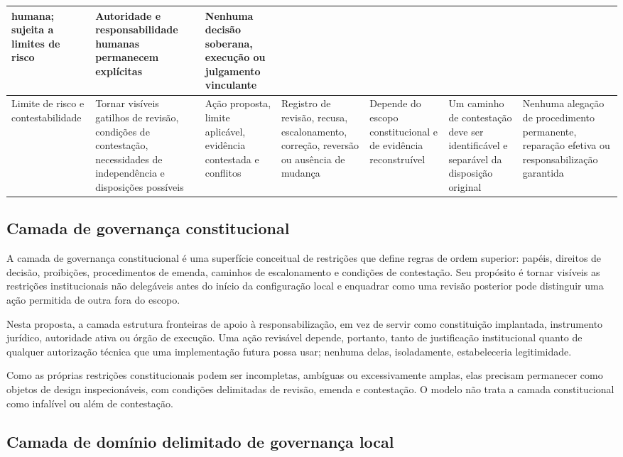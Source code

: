 \documentclass[11pt]{article}
\begin{document}
\begin{landscape}
\begin{center}
\begin{tabularx}{\linewidth}{|X|X|X|X|X|X|X|}
humana; sujeita a limites de risco & Autoridade e responsabilidade humanas
permanecem explícitas & Nenhuma decisão soberana, execução ou julgamento
vinculante \\
\hline
Limite de risco e contestabilidade & Tornar visíveis gatilhos de revisão,
condições de contestação, necessidades de independência e disposições possíveis
& Ação proposta, limite aplicável, evidência contestada e conflitos & Registro
de revisão, recusa, escalonamento, correção, reversão ou ausência de mudança &
Depende do escopo constitucional e de evidência reconstruível & Um caminho de
contestação deve ser identificável e separável da disposição original &
Nenhuma alegação de procedimento permanente, reparação efetiva ou
responsabilização garantida \\
\hline
\end{tabularx}
\end{center}
\end{landscape}

\subsection{Camada de governança constitucional}

A camada de governança constitucional é uma superfície conceitual de
restrições que define regras de ordem superior: papéis, direitos de decisão,
proibições, procedimentos de emenda, caminhos de escalonamento e condições de
contestação. Seu propósito é tornar visíveis as restrições institucionais não
delegáveis antes do início da configuração local e enquadrar como uma revisão
posterior pode distinguir uma ação permitida de outra fora do escopo.

Nesta proposta, a camada estrutura fronteiras de apoio à responsabilização, em
vez de servir como constituição implantada, instrumento jurídico, autoridade
ativa ou órgão de execução. Uma ação revisável depende, portanto, tanto de
justificação institucional quanto de qualquer autorização técnica que uma
implementação futura possa usar; nenhuma delas, isoladamente, estabeleceria
legitimidade.

Como as próprias restrições constitucionais podem ser incompletas, ambíguas ou
excessivamente amplas, elas precisam permanecer como objetos de design
inspecionáveis, com condições delimitadas de revisão, emenda e contestação. O
modelo não trata a camada constitucional como infalível ou além de
contestação.

\subsection{Camada de domínio delimitado de governança local}
\end{document}
